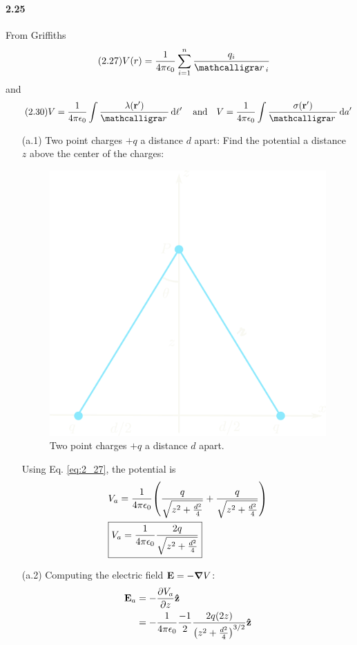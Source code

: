 \documentclass[../main.tex]{subfiles}
\begin{document}
\paragraph{2.25} \label{prob:2_25}
From Griffiths %
\begin{align*} \tag{2.27} \label{eq:2_27}
    V(r) &= \ke \sum_{i = 1}^n \frac{q_i}{\scriptr_i}
\end{align*}
and
\begin{align*} \tag{2.30} \label{eq:2_30}
    V = \ke \int \frac{\lambda(\vb r')}{\scriptr} \dd{\ell'} \qand V = \ke \int \frac{\sigma(\vb r')}{\scriptr} \dd{a'} 
\end{align*}
\begin{enumerate}
    \item [(a.1)] Two point charges $+q$ a distance $d$ apart: Find the potential a distance $z$ above the center of the charges:
    \begin{figure}[ht]
        \centering
        \includegraphics[width=0.5\linewidth]{images/hw2_25a.png}
        \captionsetup{width=0.8\linewidth}
        \caption{Two point charges $+q$ a distance $d$ apart.}
        \label{fig:2_25a}
    \end{figure}
    Using Eq. \eqref{eq:2_27}, the potential is
    \begin{align*}
        &V_a = \ke \qt(\frac{q}{\sqrt{z^2 + \frac{d^2}{4}}} + \frac{q}{\sqrt{z^2 + \frac{d^2}{4}}}) \\
        &\boxed{V_a = \ke \frac{2q}{\sqrt{z^2 + \frac{d^2}{4}}}}
    \end{align*}
    \item [(a.2)] Computing the electric field $\vb E = -\grad V$:
    \begin{align*}
        \vb E_a &= -\pdv{V_a}{z} \vu z \\
        &= -\ke \frac{-1}{2} \frac{2q(2z)}{\qt(z^2 + \frac{d^2}{4})^{3/2}} \vu z
    \end{align*}

\end{enumerate}
\end{document}
